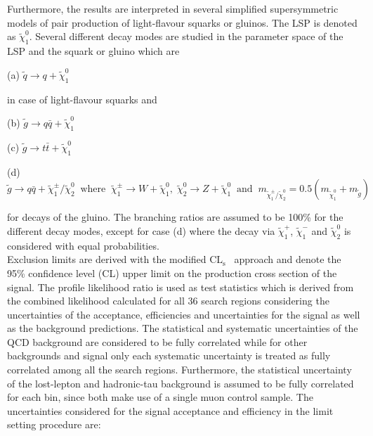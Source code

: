 \\
\\
Furthermore, the results are interpreted in several simplified supersymmetric models of pair production of light-flavour squarks or gluinos. The LSP is denoted as $\tilde{\chi}_1^0$. Several different decay modes are studied in the parameter space of the LSP and the squark or gluino which are
\begin{description}
\item (a) $\tilde{q} \rightarrow q + \tilde{\chi}_1^0$
\end{description} 
in case of light-flavour squarks and
\begin{description}
\item (b) $\tilde{g} \rightarrow q\bar{q} + \tilde{\chi}_1^0$
\item (c) $\tilde{g} \rightarrow t\bar{t} + \tilde{\chi}_1^0$
\item (d) $\tilde{g} \rightarrow q\bar{q} + \tilde{\chi}_1^{\pm}/\tilde{\chi}_2^0 \;\; \mathrm{where} \;\; \tilde{\chi}_1^{\pm} \rightarrow W + \tilde{\chi}_1^0, \; \tilde{\chi}_2^0 \rightarrow Z + \tilde{\chi}_1^0 \;\; \mathrm{and} \;\; m_{\tilde{\chi}_1^{\pm}/\tilde{\chi}_2^0} = 0.5(m_{{\tilde{\chi}^0_1}} + m_{\tilde{g}})$ 
\end{description}  
for decays of the gluino. The branching ratios are assumed to be 100\% for the different decay modes, except for case (d) where the decay via $\tilde{\chi}_1^{+}$, $\tilde{\chi}_1^{-}$ and $\tilde{\chi}_2^0$ is considered with equal probabilities. \\
Exclusion limits are derived with the modified $\mathrm{CL_s}$~\cite{0954-3899-28-10-313, Thomas1999435, bib:Higgs:CLS} approach and denote the 95\% confidence level (CL) upper limit on the production cross section of the signal. The profile likelihood ratio is used as test statistics which is derived from the combined likelihood calculated for all 36 search regions considering the uncertainties of the acceptance, efficiencies and uncertainties for the signal as well as the background predictions. The statistical and systematic uncertainties of the QCD background are considered to be fully correlated while for other backgrounds and signal only each systematic uncertainty is treated as fully correlated among all the search regions. Furthermore, the statistical uncertainty of the lost-lepton and hadronic-tau background is assumed to be fully correlated for each bin, since both make use of a single muon control sample. The uncertainties considered for the signal acceptance and efficiency in the limit setting procedure are:  
